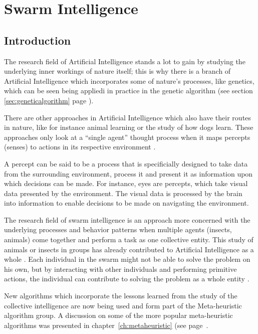 \chapter{Swarm Intelligence}
\section{Introduction}
The research field of Artificial Intelligence stands a lot to gain by studying the underlying inner workings of nature itself; this is why there is a branch of Artificial Intelligence which incorporates some of nature’s processes, like genetics, which can be seen being appliedi in practice in the genetic algorithm (see section \ref{sec:geneticalgorithm} page \pageref{sec:geneticalgorithm}).

 There are other approaches in Artificial Intelligence which also have their routes in nature, like for instance animal learning or the study of how dogs learn. These approaches only look at a “single agent” thought process when it maps percepts (senses) to actions in its respective environment \cite{DLearning}. 
 
 A percept can be said to be a process that is specificially designed to take data from the surrounding environment, process it and present it as information upon which decisions can be made\cite{DLearning,AIModernApproach}. For instance, eyes are percepts, which take visual data presented by the environment. The visual data is processed by the brain into information to enable decisions to be made on navigating the environment.

The research field of swarm intelligence is an approach more concerned with the underlying processes and behavior patterns when multiple agents (insects, animals) come together and perform a task as one collective entity.  This study of animals or insects in groups has already contributed to Artificial Intelligence as a whole \cite{ChaoticSwarmIntel,BeeJobShop}. Each individual in the swarm might not be able to solve the problem on his own, but by interacting with other individuals and performing primitive actions, the individual can contribute to solving the problem as a whole entity \cite{BeeJobShop}. 

New algorithms which incorporate the lessons learned from the study of the collective intelligence are now being used and form part of the Meta-heuristic algorithm group. A discussion on some of the more popular meta-heuristic algorithms was presented in chapter~\ref{ch:metaheuristic} (see page~\pageref{ch:metaheuristic}. 

